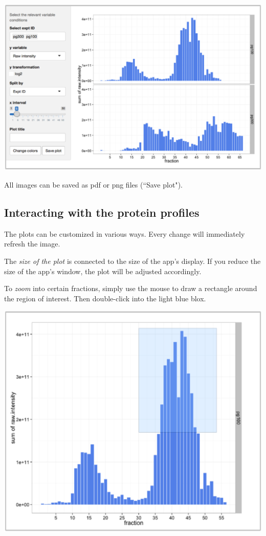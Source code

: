 \documentclass[letterpaper, twocolumn, 9pt]{article}
\begin{document}
\includegraphics[scale=.4]{figures/ss_plotsOverview02.png}

All images can be saved as pdf or png files (\textsf{``Save plot"}).

\subsection{Interacting with the protein profiles}

The plots can be customized in various ways.
Every change will immediately refresh the image.

The \textit{size of the plot} is connected to the size of the app's display.
If you reduce the size of the app's window, the plot will be adjusted accordingly.

To \textit{zoom} into certain fractions, simply use the mouse to draw a rectangle around the region of interest.
Then double-click into the light blue blox.

\begin{center}
\includegraphics[width=.9\columnwidth]{figures/ss_plotCustomizing01.png}
\end{center}
\end{document}

